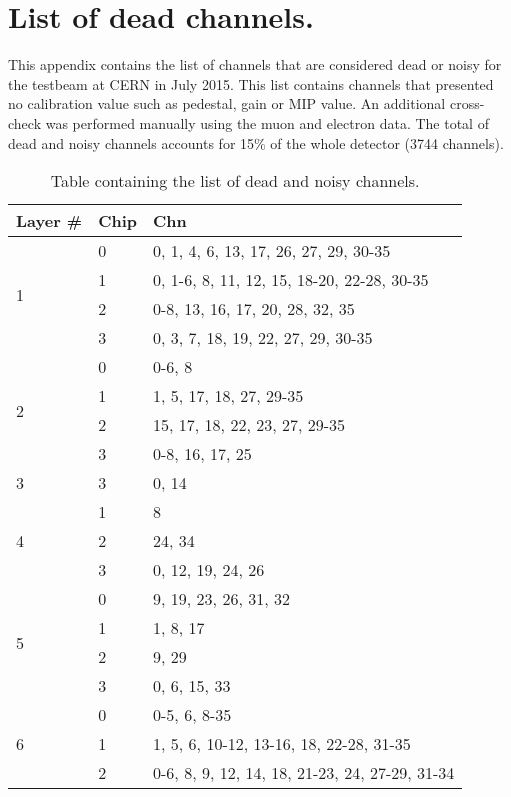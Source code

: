 \chapter{List of dead channels.}
\label{appendix:deadChn}

This appendix contains the list of channels that are considered dead or noisy for the testbeam at CERN in July 2015. This list contains channels that presented no calibration value such as pedestal, gain or MIP value. An additional cross-check was performed manually \cite{AmbraEnergy} using the muon and electron data. The total of dead and noisy channels accounts for 15\% of the whole detector (3744 channels).

\begin{table}[htb!]
  \centering
  \caption{Table containing the list of dead and noisy channels.}
  \label{table:DeadNoisyList}
  \begin{tabular}{@{} |l||l||p{8cm}| @{}}
    \hline
    Layer \# & Chip & Chn\\
    \hline
    \hline
    \multirow{4}{*}{1} & 0 & 0, 1, 4, 6, 13, 17, 26, 27, 29, 30-35\\
    & 1 & 0, 1-6, 8, 11, 12, 15, 18-20, 22-28, 30-35\\
    & 2 & 0-8, 13, 16, 17, 20, 28, 32, 35\\
    & 3 & 0, 3, 7, 18, 19, 22, 27, 29, 30-35\\
    \hline
    \multirow{4}{*}{2} & 0 & 0-6, 8\\
    & 1 & 1, 5, 17, 18, 27, 29-35\\
    & 2 & 15, 17, 18, 22, 23, 27, 29-35\\
    & 3 & 0-8, 16, 17, 25\\
    \hline
    \multirow{1}{*}{3} & 3 & 0, 14\\
    \hline
    \multirow{3}{*}{4} & 1 & 8\\
    & 2 & 24, 34\\
    & 3 & 0, 12, 19, 24, 26\\
    \hline
    \multirow{4}{*}{5} & 0 & 9, 19, 23, 26, 31, 32\\
    & 1 & 1, 8, 17\\
    & 2 & 9, 29\\
    & 3 & 0, 6, 15, 33\\
    \hline
    \multirow{4}{*}{6} & 0 & 0-5, 6, 8-35\\
    & 1 & 1, 5, 6, 10-12, 13-16, 18, 22-28, 31-35\\
    & 2 & 0-6, 8, 9, 12, 14, 18, 21-23, 24, 27-29, 31-34\\

\end{tabular}
\end{table}

